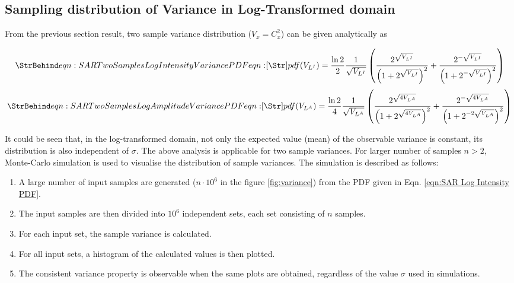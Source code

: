 \subsection{Sampling distribution of Variance in Log-Transformed domain}

From the previous section result, two sample variance distribution ($V_x = C_x^2$) can be given analytically as

\begin{equation}
  \label{eqn: SAR Two Samples Log Intensity Variance PDF}
  \caption{eqn: SAR Two Samples Log Intensity Variance PDF}
pdf(V_{L^I}) = 
	\frac{\ln2}{2} \frac{1}{\sqrt{V_{L^I}}} \left( \frac{2^{\sqrt{V_{L^I}}}}{\left( 1+2^{\sqrt{V_{L^I}}} \right)^2} + \frac{2^{-\sqrt{V_{L^I}}}}{\left( 1+2^{-\sqrt{V_{L^I}}} \right)^2} \right)
\end{equation}
\begin{equation}
  \label{eqn: SAR Two Samples Log Amplitude Variance PDF}
  \caption{eqn: SAR Two Samples Log Amplitude Variance PDF}
pdf(V_{L^A}) =
	\frac{\ln2}{4} \frac{1}{\sqrt{V_{L^A}}} \left( \frac{2^{\sqrt{4 V_{L^A}}}}{\left( 1+2^{\sqrt{4 V_{L^A}}} \right)^2} + \frac{2^{-\sqrt{4 V_{L^A}}}}{\left( 1+2^{-2\sqrt{V_{L^A}}} \right)^2} \right)
\end{equation}

It could be seen that, in the log-transformed domain, not only the expected value (mean) of the observable variance is constant, its distribution is also independent of $\sigma$. 
The above analysis is applicable for two sample variances. 
For larger number of samples $n > 2$, Monte-Carlo simulation is used to visualise the distribution of sample variances. 
The simulation is described as follows:

\begin{enumerate}
\item A large number of input samples are generated ($n \cdot 10^6$ in the figure \ref{fig:variance}) from the PDF given in Eqn. \ref{eqn:SAR Log Intensity PDF}.
\item The input samples are then divided into $10^6$ independent sets, each set consisting of $n$ samples.
\item For each input set, the sample variance is calculated.
\item For all input sets, a histogram of the calculated values is then plotted.
\item The consistent variance property is observable when the same plots are obtained, regardless of the value $\sigma$ used in simulations.
\end{enumerate}

